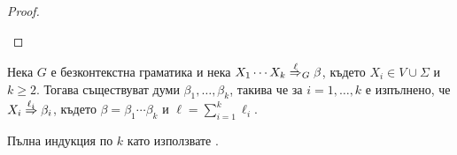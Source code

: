 \begin{proof}
\begin{itemize}
  
\end{itemize}
\end{proof}

\begin{proposition}\label{pr:grammar:divide}
  Нека $G$ е безконтекстна граматика и нека $X_1\cdots X_k \stackrel{{\ell}}{\Rightarrow}_G \beta$, където $X_i \in V \cup \Sigma$ и $k \geq 2$.
  Тогава съществуват думи $\beta_1,\dots,\beta_k$, такива че за $i = 1,\dots, k$ е изпълнено, че
  $X_i \stackrel{{\ell_i}}{\Rightarrow} \beta_i$, където $\beta = \beta_1\cdots \beta_k$ и $\ell = \sum^k_{i = 1}\ell_i$.
\end{proposition}
\begin{hint}
  Пълна индукция по $k$ като използвате .
\end{hint}

